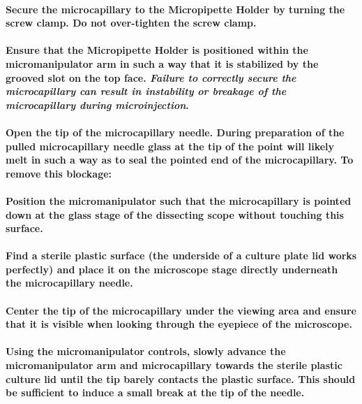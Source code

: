 \documentclass[11pt]{article}
\begin{document}
\paragraph{{\sffamily } Secure the microcapillary to the Micropipette Holder by turning the screw clamp. Do not over-tighten the screw clamp.}
\label{sec:orgheadline31}
\paragraph{{\sffamily } Ensure that the Micropipette Holder is positioned within the micromanipulator arm in such a way that it is stabilized by the grooved slot on the top face. \emph{Failure to correctly secure the microcapillary can result in instability or breakage of the microcapillary during microinjection}.}
\label{sec:orgheadline32}
\paragraph{{\sffamily } Open the tip of the microcapillary needle. During preparation of the pulled microcapillary needle glass at the tip of the point will likely melt in such a way as to seal the pointed end of the microcapillary. To remove this blockage:}
\label{sec:orgheadline33}
\paragraph{{\sffamily } Position the micromanipulator such that the microcapillary is pointed down at the glass stage of the dissecting scope without touching this surface.}
\label{sec:orgheadline34}
\paragraph{{\sffamily } Find a sterile plastic surface (the underside of a culture plate lid works perfectly) and place it on the microscope stage directly underneath the microcapillary needle.}
\label{sec:orgheadline35}
\paragraph{{\sffamily } Center the tip of the microcapillary under the viewing area and ensure that it is visible when looking through the eyepiece of the microscope.}
\label{sec:orgheadline36}
\paragraph{{\sffamily } Using the micromanipulator controls, slowly advance the micromanipulator arm and microcapillary towards the sterile plastic culture lid until the tip barely contacts the plastic surface. This should be sufficient to induce a small break at the tip of the needle.}
\label{sec:orgheadline37}
\end{document}
